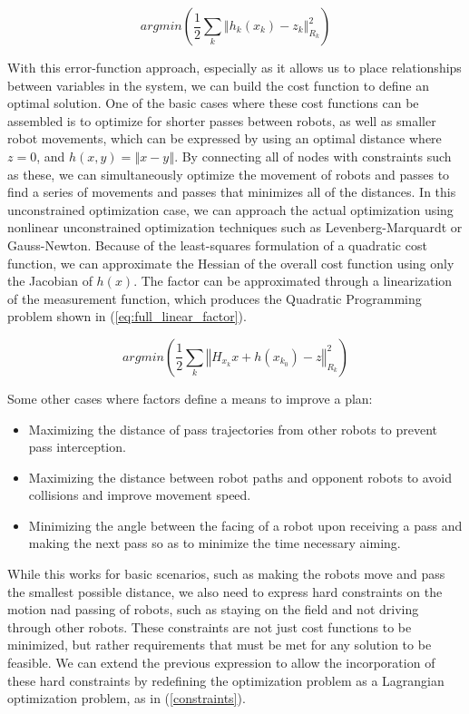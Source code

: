\documentclass[a4paper, 10pt, conference]{ieeeconf}      %
\begin{document}
\begin{equation} \label{factors}
 argmin(\frac{1}{2}\sum_{k}\left\Vert h_{k}(x_{k})-z_{k}\right\Vert _{R_{k}}^{2})
\end{equation} 

With this error-function approach, especially as it allows us to place relationships between variables in the system, we can build the cost function to define an optimal solution.  One of the basic cases where these cost functions can be assembled is to optimize for shorter passes between robots, as well as smaller robot movements, which can be expressed by using an optimal distance where $z=0$, and $h(x,y)=\left\Vert x-y \right\Vert$.  By connecting all of nodes with constraints such as these, we can simultaneously optimize the movement of robots and passes to find a series of movements and passes that minimizes all of the distances.  In this unconstrained optimization case, we can approach the actual optimization using nonlinear unconstrained optimization techniques such as Levenberg-Marquardt or Gauss-Newton. Because of the least-squares formulation of a quadratic cost function, we can approximate the Hessian of the overall cost function using only the Jacobian of $h(x)$.  The factor can be approximated through a linearization of the measurement function, which produces the Quadratic Programming problem shown in (\ref{eq:full_linear_factor}).  

\begin{equation} \label{eq:full_linear_factor}
argmin(\frac{1}{2}\sum_{k}\left\Vert H_{x_{k}}x+h(x_{k_{0}})-z\right\Vert _{R_{k}}^{2})
\end{equation}

Some other cases where factors define a means to improve a plan:
\begin{itemize}
 \item Maximizing the distance of pass trajectories from other robots to prevent pass interception.
 \item Maximizing the distance between robot paths and opponent robots to avoid collisions and improve movement speed.
 \item Minimizing the angle between the facing of a robot upon receiving a pass and making the next pass so as to minimize the time necessary aiming.  
\end{itemize}


While this works for basic scenarios, such as making the robots move and pass the smallest possible distance, we also need to express hard constraints on the motion nad passing of robots, such as staying on the field and not driving through other robots.  These constraints are not just cost functions to be minimized, but rather requirements that must be met for any solution to be feasible.  We can extend the previous expression to allow the incorporation of these hard constraints by redefining the optimization problem as a Lagrangian optimization problem, as in (\ref{constraints}).  
\end{document}
